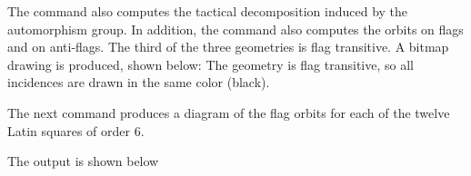 


The command also computes the 
tactical decomposition induced by the automorphism group. 
In addition, the command also computes the orbits on flags and on anti-flags. 
The third of the three geometries is flag transitive.
A bitmap drawing is produced, 
shown below:
The geometry is flag transitive, so all incidences are drawn in the same color (black).

\bigskip

The next command produces a diagram of the flag orbits 
for each of the twelve Latin squares of order 6.


The output is shown below


